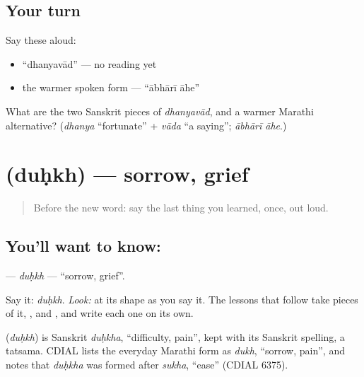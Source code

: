 \subsection*{Your turn}
Say these aloud:

\begin{itemize}
\raggedright
  \item \textquotedblleft{}dhanyavād\textquotedblright{} — no reading yet
  \item the warmer spoken form — \textquotedblleft{}ābhārī āhe\textquotedblright{}
\end{itemize}

\begin{tcolorbox}[breakable,colback=teal!4,colframe=teal!35!black,title={Before you move on}]
What are the two Sanskrit pieces of \emph{dhanyavād}, and a warmer Marathi alternative? (\emph{dhanya} \textquotedblleft{}fortunate\textquotedblright{} + \emph{vāda} \textquotedblleft{}a saying\textquotedblright{}; \emph{ābhārī āhe}.)
\end{tcolorbox}
\section[\texorpdfstring{\mr{दुःख} (duḥkh)}{दुःख (duḥkh)}]{ (duḥkh) — sorrow, grief}

\label{lesson:MR-C02-dukh}



\begin{quote}
Before the new word: say the last thing you learned, once, out loud.
\end{quote}

\subsection*{You'll want to know: }
\textbf{} — \emph{duḥkh} — \textquotedblleft{}sorrow, grief\textquotedblright{}.

Say it: \emph{duḥkh}. \emph{Look:} at its shape as you say it. The lessons that follow take pieces of it, \textbf{}, \textbf{} and \textbf{}, and write each one on its own.

\begin{cousinweb}
\textbf{} (\emph{duḥkh}) is Sanskrit \emph{duḥkha}, \textquotedblleft{}difficulty, pain\textquotedblright{}, kept with its Sanskrit spelling, a tatsama. CDIAL lists the everyday Marathi form as \emph{dukh}, \textquotedblleft{}sorrow, pain\textquotedblright{}, and notes that \emph{duḥkha} was formed after \emph{sukha}, \textquotedblleft{}ease\textquotedblright{} (CDIAL 6375).
\end{cousinweb}

